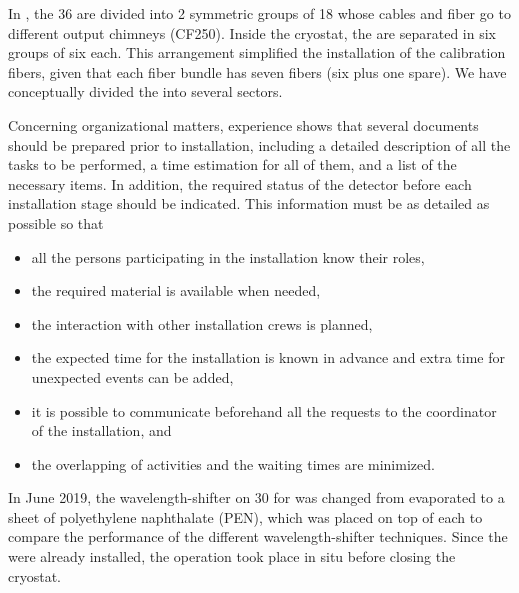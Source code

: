 In , the \num{36}  are divided into \num{2} symmetric groups of 18 whose cables and fiber go to different output chimneys (CF250). Inside the cryostat, the  are separated in six groups of six each. This arrangement simplified the installation of the calibration fibers, given that each fiber bundle has seven fibers (six plus one spare). We have conceptually divided the   into several sectors. 

Concerning organizational matters,  experience shows that several documents should be prepared prior to installation, including a detailed description of all the tasks to be performed, a time estimation for all of them, and a list of the necessary items. In addition, the required status of the detector before each installation stage should be indicated. This information must be as detailed as possible so that %

\begin{itemize}
\item all the persons participating in the  installation know their roles,
\item the required material is %
available when needed,
\item the interaction with other installation crews is planned,
\item the expected time for the installation is known in advance and extra time for unexpected events can be added,
\item it is possible to communicate beforehand all the requests to the coordinator of the installation, and
\item the overlapping of activities and the waiting times are minimized. 
\end{itemize}

In June 2019, the wavelength-shifter on 30  for  was changed from evaporated  to a sheet of polyethylene naphthalate (PEN), which was placed on top of each  to compare the performance of the different wavelength-shifter techniques. Since the  were already installed, the operation took place in situ before closing the cryostat. 


